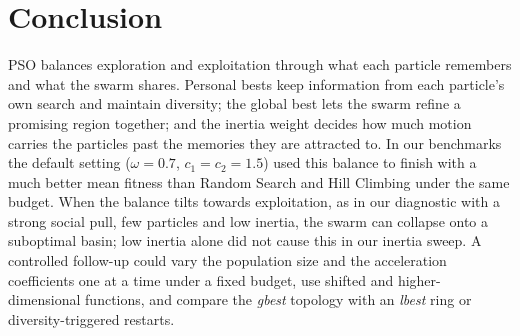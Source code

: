 \documentclass[11pt,a4paper]{article}
\newcommand{\tn}[1]{\textit{#1}}
\begin{document}
\section{Conclusion}\label{sec:conclusion}
PSO balances exploration and exploitation through what each particle remembers and what the swarm shares. Personal bests keep information from each particle's own search and maintain diversity; the global best lets the swarm refine a promising region together; and the inertia weight decides how much motion carries the particles past the memories they are attracted to. In our benchmarks the default setting ($\omega=0.7$, $c_1=c_2=1.5$) used this balance to finish with a much better mean fitness than Random Search and Hill Climbing under the same budget. When the balance tilts towards exploitation, as in our diagnostic with a strong social pull, few particles and low inertia, the swarm can collapse onto a suboptimal basin; low inertia alone did not cause this in our inertia sweep. A controlled follow-up could vary the population size and the acceleration coefficients one at a time under a fixed budget, use shifted and higher-dimensional functions, and compare the \tn{gbest} topology with an \tn{lbest} ring or diversity-triggered restarts.
\end{document}
